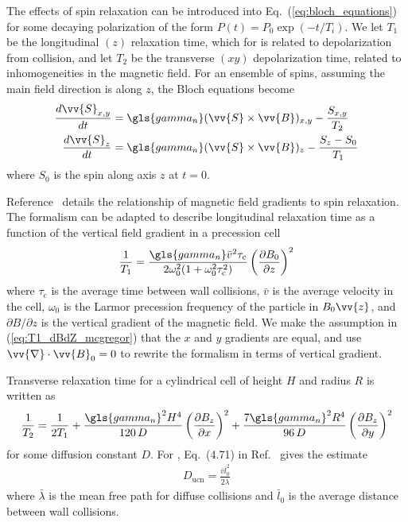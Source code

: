 The effects of spin relaxation can be introduced into Eq.~(\ref{eq:bloch_equations}) for some decaying polarization of the form $P(t)=P_0 \exp(-t/T_i)$. We let $T_1$ be the longitudinal $(z)$ relaxation time, which for \ucn is related to depolarization from collision, and let $T_2$ be the transverse $(xy)$ depolarization time, related to inhomogeneities in the magnetic field. For an ensemble of spins, assuming the main field direction is along $z$, the Bloch equations become
%
\begin{align}
    \frac{d\vv{S}_{x,y}}{dt} &= \gls{gamma_n} (\vv{S} \times \vv{B})_{x,y}-\frac{S_{x,y}}{T_2} \\
    \frac{d\vv{S}_z}{dt} &= \gls{gamma_n} (\vv{S} \times \vv{B})_{z}-\frac{S_z-S_0}{T_1}
\end{align}
%
where $S_0$ is the spin along axis $z$ at $t=0$.

Reference~\cite{mcgregor_transverse_1990} details the relationship of magnetic field gradients to spin relaxation. The formalism can be adapted to describe longitudinal relaxation time as a function of the vertical field gradient in a precession cell
%
\begin{gather}
    \frac{1}{T_1}=\frac{\gls{gamma_n} \bar{v}^2 \tau_\text{c}}{2\omega_0^2(1+\omega_0^2\tau_\text{c}^2)}\left(\frac{\partial B_0}{\partial z}\right)^2 \label{eq:T1_dBdZ_mcgregor}
\end{gather}
%
where $\tau_\text{c}$ is the average time between wall collisions, $\bar{v}$ is the average velocity in the cell, $\omega_0$ is the Larmor precession frequency of the particle in $B_0\vv{z}$, and $\partial B/\partial z$ is the vertical gradient of the magnetic field. We make the assumption in (\ref{eq:T1_dBdZ_mcgregor}) that the $x$ and $y$ gradients are equal, and use $\vv{\nabla}\cdot \vv{B}_0=0$ to rewrite the formalism in terms of vertical gradient.

Transverse relaxation time for a cylindrical cell of height $H$ and radius $R$ is written as~\cite{mcgregor_transverse_1990}
%
\begin{gather}
    \frac{1}{T_2}=\frac{1}{2T_1}+\frac{\gls{gamma_n}^2 H^4}{120\,D}\left(\frac{\partial B_z}{\partial x}\right)^2 + \frac{7\gls{gamma_n}^2 R^4}{96\,D}\left( \frac{\partial B_z}{\partial y} \right)^2
    \label{eq:T2_mcgregor}
\end{gather}
%
for some diffusion constant $D$. For \ucn, Eq.~(4.71) in Ref.~\cite{golubUCN} gives the estimate
%
\begin{gather}
    D_\text{ucn}=\frac{\bar{v}\bar{l}_0^2}{2\bar{\lambda}}\label{eq:ucn_diffusion_constant}
\end{gather}
%
where $\bar{\lambda}$ is the mean free path for diffuse collisions and $\bar{l}_0$ is the average distance between wall collisions.

